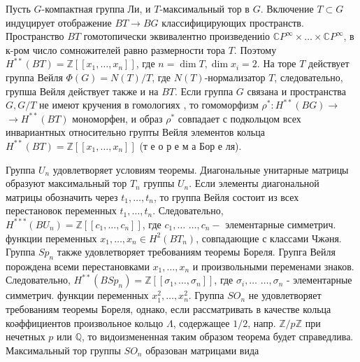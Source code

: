\documentclass[10pt]{article}
\begin{document}
Пусть $G$-компактная группа Ли, и $T$-максимальный тор в $G$. Включение $T \subset G$ индуцирует отображение $B T \longrightarrow B G$ классифицирующих пространств. Пространство $B T$ гомотопически эквивалентно произведениіо $\mathbb{C} P^{\infty} \times \ldots \times \mathbb{C} P^{\infty}$, в к-ром число сомножителей равно размерности тора $T$. Поэтому $H^{* *}(B T)=\mathbb{Z}\left[\left[x_{1}, \ldots, x_{n}\right]\right]$, где $n=\operatorname{dim} T, \operatorname{dim} x_{i}=2$. На торе $T$ действует группа Вейля $\Phi(G)=N(T) / T$, где $N(T)$-нормализатор $T$, следовательно, групша Вейля действует также и на $B T$. Если группа $G$ связана и пространства $G, G / T$ не имеют кручения в гомологиях , то гомоморфизм $\rho^{*}: H^{* *}(B G) \longrightarrow$ $\longrightarrow H^{* *}(B T)$ мономорфен, и образ $\rho^{*}$ совпадает с подкольцом всех инвариантных относительно групты Вейля элементов кольца $H^{* *}(B T)=\mathbb{Z}\left[\left[x_{1}, \ldots, x_{n}\right]\right]$ (т е о р е м а Бор е ля).



Группа $U_{n}$ удовлетворяет условиям теоремы. Диагональные унитарные матрицы образуют максимальный тор $T_{n}$ группы $U_{n}$. Если элементы диагональной матрицы обозначить через $t_{1}, \ldots, t_{n}$, то группа Вейля состоит из всех перестановок переменных $t_{1}, \ldots, t_{n}$. Следовательно, $H^{* * *}\left(B U_{n}\right)=\mathbb{Z}\left[\left[c_{1}, \ldots, c_{n}\right]\right]$, где $c_{1}, \ldots$ $\ldots, c_{n}-$ элементарные симметрич. функции переменных $x_{1}, \ldots, x_{n} \in H^{2}\left(B T_{n}\right)$, совпадающие с классами Чжәня. Группа $S p_{n}$ также удовлетворяет требованиям теоремы Бореля. Групга Вейля порождена всеми перестановками $x_{1}, \ldots, x_{n}$ и произвольными переменами знаков. Следовательно, $H^{* *}\left(B S p_{n}\right)=\mathbb{Z}\left[\left[\sigma_{1}, \ldots, \sigma_{n}\right]\right]$, где $\sigma_{i}, \ldots$ $\ldots, \sigma_{n}$ - элементарные симметрич. функции переменных $x_{1}^{2}, \ldots, x_{n}^{2}$. Группа $S O_{n}$ не удовлетворяет требованиям теоремы Бореля, однако, если рассматривать в качестве кольца коәффициентов произвольное кольцо $\Lambda$, содержащее $1 / 2$, напр. $\mathbb{Z} / p \mathbb{Z}$ при нечетных $p$ или $\mathbb{Q}$, то видоизмененная таким образом теорема будет справедлива. Максимальный тор группы $S O_{n}$ образован матрицами вида
\end{document}

